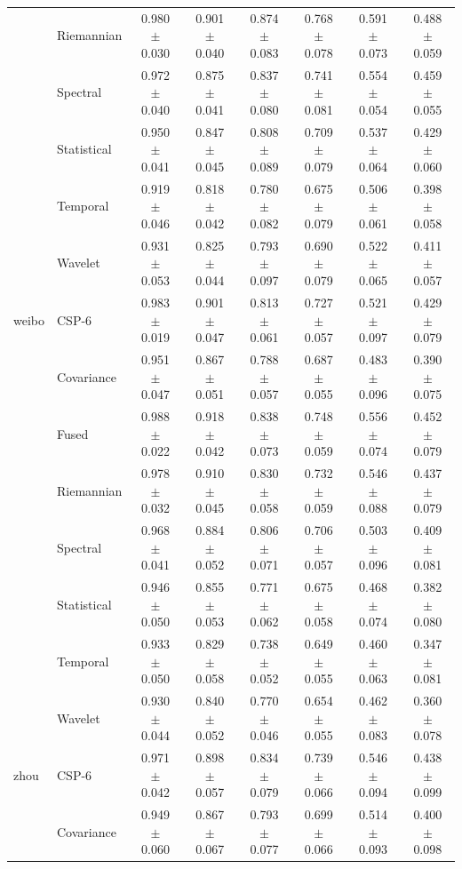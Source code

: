 \begin{table}[t]
\begin{tabular}{llcccccc}
 & Riemannian & 0.980 $\pm$ 0.030 & 0.901 $\pm$ 0.040 & 0.874 $\pm$ 0.083 & 0.768 $\pm$ 0.078 & 0.591 $\pm$ 0.073 & 0.488 $\pm$ 0.059 \\
 & Spectral & 0.972 $\pm$ 0.040 & 0.875 $\pm$ 0.041 & 0.837 $\pm$ 0.080 & 0.741 $\pm$ 0.081 & 0.554 $\pm$ 0.054 & 0.459 $\pm$ 0.055 \\
 & Statistical & 0.950 $\pm$ 0.041 & 0.847 $\pm$ 0.045 & 0.808 $\pm$ 0.089 & 0.709 $\pm$ 0.079 & 0.537 $\pm$ 0.064 & 0.429 $\pm$ 0.060 \\
 & Temporal & 0.919 $\pm$ 0.046 & 0.818 $\pm$ 0.042 & 0.780 $\pm$ 0.082 & 0.675 $\pm$ 0.079 & 0.506 $\pm$ 0.061 & 0.398 $\pm$ 0.058 \\
 & Wavelet & 0.931 $\pm$ 0.053 & 0.825 $\pm$ 0.044 & 0.793 $\pm$ 0.097 & 0.690 $\pm$ 0.079 & 0.522 $\pm$ 0.065 & 0.411 $\pm$ 0.057 \\
\midrule
weibo & CSP-6 & 0.983 $\pm$ 0.019 & 0.901 $\pm$ 0.047 & 0.813 $\pm$ 0.061 & 0.727 $\pm$ 0.057 & 0.521 $\pm$ 0.097 & 0.429 $\pm$ 0.079 \\
 & Covariance & 0.951 $\pm$ 0.047 & 0.867 $\pm$ 0.051 & 0.788 $\pm$ 0.057 & 0.687 $\pm$ 0.055 & 0.483 $\pm$ 0.096 & 0.390 $\pm$ 0.075 \\
 & Fused & 0.988 $\pm$ 0.022 & 0.918 $\pm$ 0.042 & 0.838 $\pm$ 0.073 & 0.748 $\pm$ 0.059 & 0.556 $\pm$ 0.074 & 0.452 $\pm$ 0.079 \\
 & Riemannian & 0.978 $\pm$ 0.032 & 0.910 $\pm$ 0.045 & 0.830 $\pm$ 0.058 & 0.732 $\pm$ 0.059 & 0.546 $\pm$ 0.088 & 0.437 $\pm$ 0.079 \\
 & Spectral & 0.968 $\pm$ 0.041 & 0.884 $\pm$ 0.052 & 0.806 $\pm$ 0.071 & 0.706 $\pm$ 0.057 & 0.503 $\pm$ 0.096 & 0.409 $\pm$ 0.081 \\
 & Statistical & 0.946 $\pm$ 0.050 & 0.855 $\pm$ 0.053 & 0.771 $\pm$ 0.062 & 0.675 $\pm$ 0.058 & 0.468 $\pm$ 0.074 & 0.382 $\pm$ 0.080 \\
 & Temporal & 0.933 $\pm$ 0.050 & 0.829 $\pm$ 0.058 & 0.738 $\pm$ 0.052 & 0.649 $\pm$ 0.055 & 0.460 $\pm$ 0.063 & 0.347 $\pm$ 0.081 \\
 & Wavelet & 0.930 $\pm$ 0.044 & 0.840 $\pm$ 0.052 & 0.770 $\pm$ 0.046 & 0.654 $\pm$ 0.055 & 0.462 $\pm$ 0.083 & 0.360 $\pm$ 0.078 \\
\midrule
zhou & CSP-6 & 0.971 $\pm$ 0.042 & 0.898 $\pm$ 0.057 & 0.834 $\pm$ 0.079 & 0.739 $\pm$ 0.066 & 0.546 $\pm$ 0.094 & 0.438 $\pm$ 0.099 \\
 & Covariance & 0.949 $\pm$ 0.060 & 0.867 $\pm$ 0.067 & 0.793 $\pm$ 0.077 & 0.699 $\pm$ 0.066 & 0.514 $\pm$ 0.093 & 0.400 $\pm$ 0.098 \\

\end{tabular}
\end{table}
